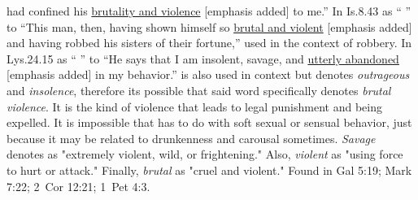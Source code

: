 had confined his \underline{brutality and violence} [emphasis added] to me.'' In Is.8.43 as `` \underline{} '' to ``This man, then, having shown himself so \underline{brutal and violent} [emphasis added] and having robbed his sisters of their fortune,'' used in the context of robbery. In Lys.24.15 as `` \underline{} '' to ``He says that I am insolent, savage, and \underline{utterly abandoned} [emphasis added] in my behavior.''  is also used in context but denotes \emph{outrageous} and \emph{insolence}, therefore its possible that said word specifically denotes \emph{brutal violence}. It is the kind of violence that leads to legal punishment and being expelled. It is impossible that  has to do with soft sexual or sensual behavior, just because it may be related to drunkenness and carousal sometimes. \emph{Savage} denotes as "extremely violent, wild, or frightening." Also, \emph{violent} as "using force to hurt or attack." Finally, \emph{brutal} as "cruel and violent."
Found in Gal 5:19; Mark 7:22; 2~Cor 12:21; 1~Pet 4:3.
